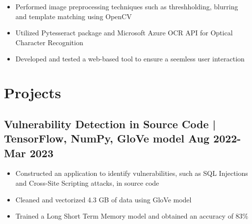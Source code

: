 \documentclass[10pt]{article}
\newenvironment{zitemize}{
\begin{itemize}\itemsep2pt \parskip0pt \parsep1pt}
{\end{itemize}\vspace{-0.7cm}}
\begin{document}
    \begin{zitemize}
        \item Performed image preprocessing techniques such as threshholding, blurring and template matching using OpenCV
        \item Utilized Pytesseract package and Microsoft Azure OCR API for Optical Character Recognition
        \item Developed and tested a web-based tool to ensure a seemless user interaction
    \end{zitemize}





\section{\textbf{Projects}} %
\vspace{2pt}



\subsection*{Vulnerability Detection in Source Code | \normalfont{} \normalsize TensorFlow, NumPy, GloVe model \hfill \textbf{Aug 2022-Mar 2023}}
    \begin{zitemize}
    \item Constructed an application to identify vulnerabilities, such as SQL Injections and  Cross-Site \newline Scripting attacks, in source code
     \item Cleaned and vectorized 4.3 GB of data using GloVe model
        \item Trained a Long Short Term Memory model and obtained an accuracy of 83\%
       
    \end{zitemize}
    \vspace{0.1cm}
\end{document}
